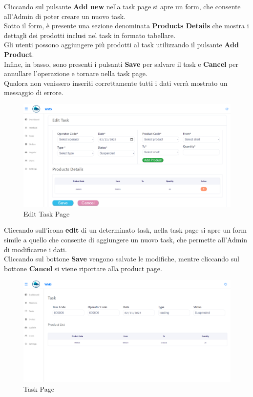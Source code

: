 Cliccando sul pulsante \textbf{Add new} nella task page si apre un form, che consente
all'Admin di poter creare un nuovo task.\\
Sotto il form, è presente una sezione denominata \textbf{Products Details} che mostra i dettagli dei prodotti inclusi
nel task in formato tabellare.\\Gli utenti possono aggiungere più prodotti al task utilizzando il pulsante \textbf{Add Product}.\\
Infine, in basso, sono presenti i pulsanti \textbf{Save} per salvare il task e \textbf{Cancel} per annullare l'operazione
e tornare nella task page.\\
Qualora non venissero inseriti correttamente tutti i dati verrà mostrato un messaggio di errore.

\begin{figure}[H]
    \centering
    \includegraphics[width=\textwidth]{document/sections/img/Storyboard/editTaskPage.png}
    \caption{Edit Task Page}
    \label{fig:editTaskPage}
\end{figure}

Cliccando sull'icona \textbf{edit} di un determinato task, nella task page si apre un form simile a quello che
consente di aggiungere un nuovo task, che permette all'Admin di modificarne i dati.\\
Cliccando sul bottone \textbf{Save} vengono salvate le modifiche, mentre cliccando sul bottone \textbf{Cancel} si viene
riportare alla product page.

\begin{figure}[H]
    \centering
    \includegraphics[width=\textwidth]{document/sections/img/Storyboard/viewTask.png}
    \caption{Task Page}
    \label{fig:viewTasksPage}
\end{figure}

